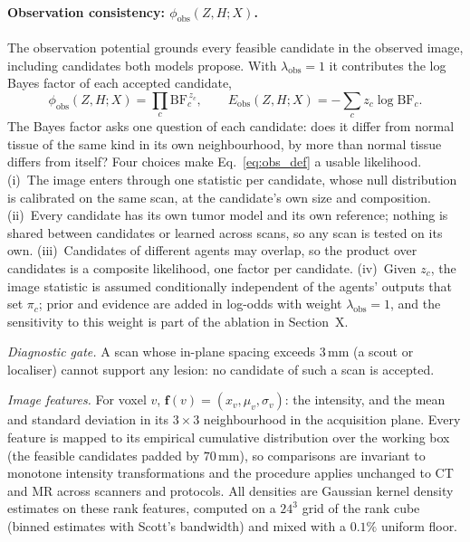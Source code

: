 \documentclass[fleqn,10pt]{olplainarticle}
\begin{document}
\paragraph{Observation consistency: $\phi_{\mathrm{obs}}(Z,H;X)$.}
The observation potential grounds every feasible candidate in the observed image, including candidates both models
propose. With $\lambda_{\mathrm{obs}}=1$ it contributes the log Bayes factor of each accepted candidate,
\begin{equation}
\label{eq:obs_def}
\phi_{\mathrm{obs}}(Z,H;X)=\prod_{c}\mathrm{BF}_c^{\,z_c},\qquad
E_{\mathrm{obs}}(Z,H;X)=-\sum_{c} z_c\log\mathrm{BF}_c .
\end{equation}
The Bayes factor asks one question of each candidate: does it differ from normal tissue of the same kind in its own
neighbourhood, by more than normal tissue differs from itself? Four choices make Eq.~\eqref{eq:obs_def} a usable
likelihood. (i)~The image enters through one statistic per candidate, whose null distribution is calibrated on the same
scan, at the candidate's own size and composition. (ii)~Every candidate has its own tumor model and its own reference;
nothing is shared between candidates or learned across scans, so any scan is tested on its own. (iii)~Candidates of
different agents may overlap, so the product over candidates is a composite likelihood, one factor per candidate.
(iv)~Given $z_c$, the image statistic is assumed conditionally independent of the agents' outputs that set $\pi_c$; prior
and evidence are added in log-odds with weight $\lambda_{\mathrm{obs}}=1$, and the sensitivity to this weight is part of the
ablation in Section~X.

\textit{Diagnostic gate.} A scan whose in-plane spacing exceeds $3$\,mm (a scout or localiser) cannot support any lesion:
no candidate of such a scan is accepted.

\textit{Image features.} For voxel $v$, $\mathbf{f}(v)=(x_v,\mu_v,\sigma_v)$: the intensity, and the mean and standard
deviation in its $3\times3$ neighbourhood in the acquisition plane. Every feature is mapped to its empirical cumulative
distribution over the working box (the feasible candidates padded by $70$\,mm), so comparisons are invariant to monotone
intensity transformations and the procedure applies unchanged to CT and MR across scanners and protocols. All densities
are Gaussian kernel density estimates on these rank features, computed on a $24^3$ grid of the rank cube (binned
estimates with Scott's bandwidth) and mixed with a $0.1\%$ uniform floor.
\end{document}
